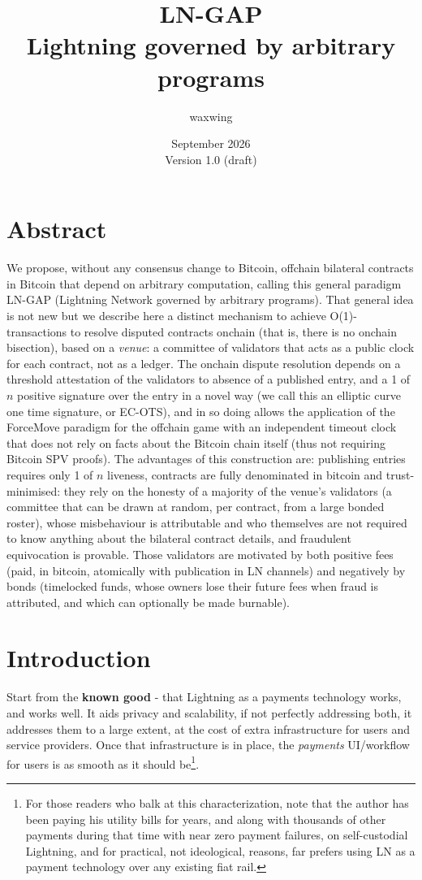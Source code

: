 \documentclass[11pt]{article}
\title{\textbf{LN-GAP}\\Lightning governed by arbitrary programs}
\author{waxwing}
\date{September 2026 \\ \medskip Version 1.0 (draft)}
\begin{document}
\maketitle

\tableofcontents

\section{Abstract}

We propose, without any consensus change to Bitcoin, offchain bilateral contracts in Bitcoin that depend on arbitrary computation, calling this general paradigm LN-GAP (Lightning Network governed by arbitrary programs). That general idea is not new but we describe here a distinct mechanism to achieve O(1)-transactions to resolve disputed contracts onchain (that is, there is no onchain bisection), based on a \emph{venue}: a committee of validators that acts as a public clock for each contract, not as a ledger. The onchain dispute resolution depends on a threshold attestation of the validators to absence of a published entry, and a 1 of $n$ positive signature over the entry in a novel way (we call this an elliptic curve one time signature, or EC-OTS), and in so doing allows the application of the ForceMove paradigm for the offchain game with an independent timeout clock that does not rely on facts about the Bitcoin chain itself (thus not requiring Bitcoin SPV proofs). The advantages of this construction are: publishing entries requires only 1 of $n$ liveness, contracts are fully denominated in bitcoin and trust-minimised: they rely on the honesty of a majority of the venue's validators (a committee that can be drawn at random, per contract, from a large bonded roster), whose misbehaviour is attributable and who themselves are not required to know anything about the bilateral contract details, and fraudulent equivocation is provable. Those validators are motivated by both positive fees (paid, in bitcoin, atomically with publication in LN channels) and negatively by bonds (timelocked funds, whose owners lose their future fees when fraud is attributed, and which can optionally be made burnable).

\section{Introduction}

Start from the \textbf{known good} - that Lightning as a payments technology works, and works well. It aids privacy and scalability, if not perfectly addressing both, it addresses them to a large extent, at the cost of extra infrastructure for users and service providers. Once that infrastructure is in place, the \emph{payments} UI/workflow for users is as smooth as it should be\footnote{For those readers who balk at this characterization, note that the author has been paying his utility bills for years, and along with thousands of other payments during that time with near zero payment failures, on self-custodial Lightning, and for practical, not ideological, reasons, far prefers using LN as a payment technology over any existing fiat rail.}.
\end{document}
